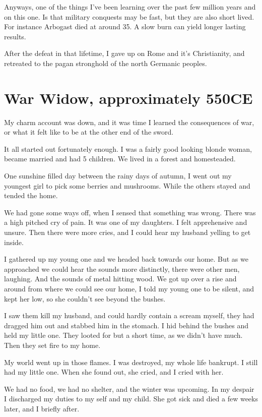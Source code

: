 Anyways, one of the things I've been learning over the past few million years
and on this one. Is that military conquests may be fast, but they are also short
lived. For instance Arbogast died at around 35. 
A slow burn can yield longer lasting results. 

After the defeat in that lifetime, I gave up on Rome and it's Christianity, and
retreated to the pagan stronghold of the north Germanic peoples. 

\chapter{War Widow, approximately 550CE}\label{reincarnation:widow}

My charm account was down, and it was time I learned the consequences of war, or
what it felt like to be at the other end of the sword. 

It all started out fortunately enough. I was a fairly good looking blonde woman,
became married and had 5 children. We lived in a forest and homesteaded. 

One sunshine filled day between the rainy days of autumn, I went out  my
youngest girl to pick some berries and mushrooms. While the others stayed and
tended the home. 

We had gone some ways off, when I sensed that something was wrong. There was a
high pitched cry of pain. It was one of my daughters. I felt apprehensive and
unsure. Then there were more cries, and I could hear my husband yelling to get
inside. 

I gathered up my young one and we headed back towards our home. But as we
approached we could hear the sounds more distinctly, there were other men,
laughing. And the sounds of metal hitting wood.
We got up over a rise and around from where we could see our home, 
I told my young one to be silent, and kept her low, so she couldn't see 
beyond the bushes. 

I saw them kill my husband, and could hardly contain a scream myself, they had
dragged him out and stabbed him in the stomach. I hid behind the bushes and held
my little one.  They looted for but a short time, as we didn't have much. Then
they set fire to my home. 

My world went up in those flames. I was destroyed, my whole life bankrupt. I
still had my little one. When she found out, she cried, and I cried with her.

We had no food, we had no shelter, and the winter was upcoming. In my despair I
discharged my duties to my self and my child. She got sick and died a few weeks
later, and I briefly after. 

